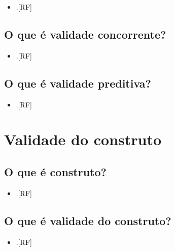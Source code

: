 \documentclass[
  a4paper,
]{book}
\providecommand{\tightlist}{%
  \setlength{\itemsep}{0pt}\setlength{\parskip}{0pt}}
\begin{document}
\begin{itemize}
\tightlist
\item
  .{[}RF{]}
\end{itemize}

\hypertarget{o-que-uxe9-validade-concorrente}{%
\subsection{O que é validade concorrente?}\label{o-que-uxe9-validade-concorrente}}

\begin{itemize}
\tightlist
\item
  .{[}RF{]}
\end{itemize}

\hypertarget{o-que-uxe9-validade-preditiva}{%
\subsection{O que é validade preditiva?}\label{o-que-uxe9-validade-preditiva}}

\begin{itemize}
\tightlist
\item
  .{[}RF{]}
\end{itemize}

\hypertarget{validade-constructo}{%
\section{Validade do construto}\label{validade-constructo}}

\hypertarget{o-que-uxe9-construto}{%
\subsection{O que é construto?}\label{o-que-uxe9-construto}}

\begin{itemize}
\tightlist
\item
  .{[}RF{]}
\end{itemize}

\hypertarget{o-que-uxe9-validade-do-construto}{%
\subsection{O que é validade do construto?}\label{o-que-uxe9-validade-do-construto}}

\begin{itemize}
\tightlist
\item
  .{[}RF{]}
\end{itemize}
\end{document}

